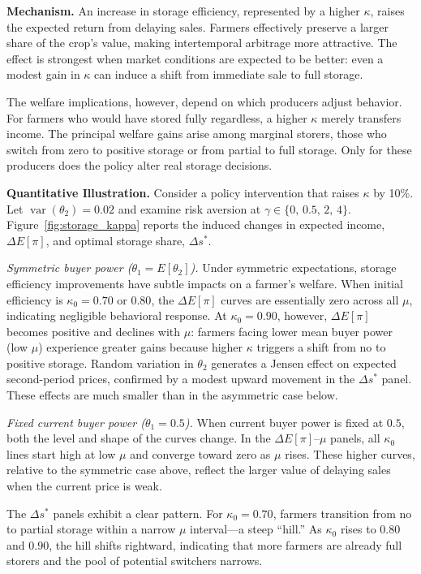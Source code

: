 \textbf{Mechanism.} 
An increase in storage efficiency, represented by a higher $\kappa$, raises the expected return from delaying sales. Farmers effectively preserve a larger share of the crop’s value, making intertemporal arbitrage more attractive. The effect is strongest when market conditions are expected to be better: even a modest gain in $\kappa$ can induce a shift from immediate sale to full storage. 

The welfare implications, however, depend on which producers adjust behavior. For farmers who would have stored fully regardless, a higher $\kappa$ merely transfers income. The principal welfare gains arise among marginal storers, those who switch from zero to positive storage or from partial to full storage. Only for these producers does the policy alter real storage decisions.


\textbf{Quantitative Illustration.} 
Consider a policy intervention that raises $\kappa$ by 10\%. Let $\operatorname{var}(\theta_2)=0.02$ and examine risk aversion at $\gamma \in \{0,\,0.5,\,2,\,4\}$. Figure~\ref{fig:storage_kappa} reports the induced changes in expected income, $\Delta E[\pi]$, and optimal storage share, $\Delta s^*$.

\emph{Symmetric buyer power ($\theta_1 = E[\theta_2]$).} 
Under symmetric expectations, storage efficiency improvements have subtle impacts on a farmer's welfare. When initial efficiency is $\kappa_0 = 0.70$ or $0.80$, the $\Delta E[\pi]$ curves are essentially zero across all $\mu$, indicating negligible behavioral response. At $\kappa_0 = 0.90$, however, $\Delta E[\pi]$ becomes positive and declines with $\mu$: farmers facing lower mean buyer power (low $\mu$) experience greater gains because higher $\kappa$ triggers a shift from no to positive storage. Random variation in $\theta_2$ generates a Jensen effect on expected second-period prices, confirmed by a modest upward movement in the $\Delta s^*$ panel. These effects are much smaller than in the asymmetric case below.


\emph{Fixed current buyer power ($\theta_1 = 0.5$).} 
When current buyer power is fixed at $0.5$, both the level and shape of the curves change. In the $\Delta E[\pi]$--$\mu$ panels, all $\kappa_0$ lines start high at low $\mu$ and converge toward zero as $\mu$ rises. These higher curves, relative to the symmetric case above, reflect the larger value of delaying sales when the current price is weak. 

The $\Delta s^*$ panels exhibit a clear pattern. For $\kappa_0 = 0.70$, farmers transition from no to partial storage within a narrow $\mu$ interval---a steep ``hill.'' As $\kappa_0$ rises to $0.80$ and $0.90$, the hill shifts rightward, indicating that more farmers are already full storers and the pool of potential switchers narrows. 


